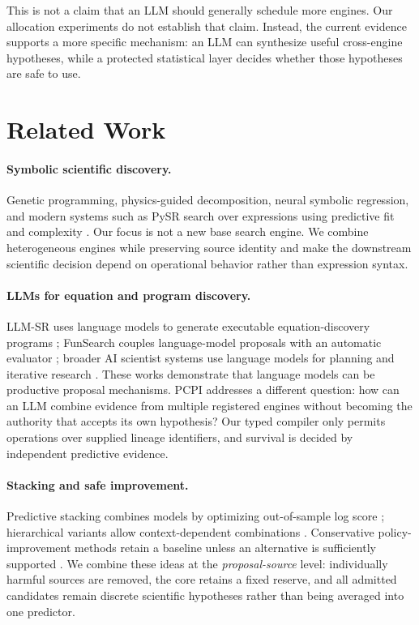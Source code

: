 \documentclass[twoside]{article}
\newcommand{\method}{PCPI}
\begin{document}
This is not a claim that an LLM should generally schedule more engines. Our
allocation experiments do not establish that claim. Instead, the current
evidence supports a more specific mechanism: an LLM can synthesize useful
cross-engine hypotheses, while a protected statistical layer decides whether
those hypotheses are safe to use.

\section{Related Work}

\paragraph{Symbolic scientific discovery.}
Genetic programming, physics-guided decomposition, neural symbolic regression,
and modern systems such as PySR search over expressions using predictive fit
and complexity \cite{koza1992gp,udrescu2020aifeynman,
petersen2021deepsymbolic,cranmer2023pysr}. Our focus is not a new base search
engine. We combine heterogeneous engines while preserving source identity and
make the downstream scientific decision depend on operational behavior rather
than expression syntax.

\paragraph{LLMs for equation and program discovery.}
LLM-SR uses language models to generate executable equation-discovery
programs \cite{shojaee2024llmsr}; FunSearch couples language-model proposals
with an automatic evaluator \cite{romeraparedes2024funsearch}; broader AI
scientist systems use language models for planning and iterative research
\cite{lu2024aiscientist,gotts2025coscientist}. These works demonstrate that
language models can be productive proposal mechanisms. \method{} addresses a
different question: how can an LLM combine evidence from multiple registered
engines without becoming the authority that accepts its own hypothesis?
Our typed compiler only permits operations over supplied lineage identifiers,
and survival is decided by independent predictive evidence.

\paragraph{Stacking and safe improvement.}
Predictive stacking combines models by optimizing out-of-sample log score
\cite{yao2018stacking}; hierarchical variants allow context-dependent
combinations \cite{yao2022hierarchical}. Conservative policy-improvement
methods retain a baseline unless an alternative is sufficiently supported
\cite{laroche2019spibb,katariya2019interleaving}. We combine these ideas at
the \emph{proposal-source} level: individually harmful sources are removed,
the core retains a fixed reserve, and all admitted candidates remain discrete
scientific hypotheses rather than being averaged into one predictor.
\end{document}
